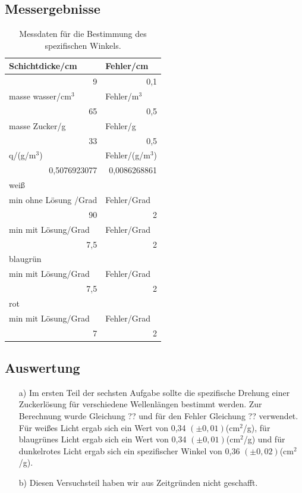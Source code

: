 \documentclass[12pt]{scrartcl}
\begin{document}
\subsection{Messergebnisse}
\begin{table}[htbp]
\caption{Messdaten für die Bestimmung des spezifischen Winkels.}
\begin{center}
\begin{tabular}{|l|l|}
\hline
Schichtdicke/cm & Fehler/cm \\ \hline
\multicolumn{1}{|r|}{9} & \multicolumn{1}{r|}{0,1} \\ \hline
masse wasser/cm$^3$ & Fehler/m$^3$ \\ \hline
\multicolumn{1}{|r|}{65} & \multicolumn{1}{r|}{0,5} \\ \hline
masse Zucker/g & Fehler/g \\ \hline
\multicolumn{1}{|r|}{33} & \multicolumn{1}{r|}{0,5} \\ \hline
q/(g/m$^3$) & Fehler/(g/m$^3$) \\ \hline
\multicolumn{1}{|r|}{0,5076923077} & \multicolumn{1}{r|}{0,0086268861} \\ \hline
weiß &  \\ \hline
min ohne Lösung /Grad & Fehler/Grad \\ \hline
\multicolumn{1}{|r|}{90} & \multicolumn{1}{r|}{2} \\ \hline
min mit Lösung/Grad & Fehler/Grad \\ \hline
\multicolumn{1}{|r|}{7,5} & \multicolumn{1}{r|}{2} \\ \hline
blaugrün &  \\ \hline
min mit Lösung/Grad & Fehler/Grad \\ \hline
\multicolumn{1}{|r|}{7,5} & \multicolumn{1}{r|}{2} \\ \hline
rot &  \\ \hline
min mit Lösung/Grad & Fehler/Grad \\ \hline
\multicolumn{1}{|r|}{7} & \multicolumn{1}{r|}{2} \\ \hline
\end{tabular}
\end{center}
\label{tab:a_6}
\end{table}
\subsection{Auswertung}
\begin{enumerate}
\item[a)]
Im ersten Teil der sechsten Aufgabe sollte die spezifische Drehung einer Zuckerlösung für verschiedene Wellenlängen bestimmt werden. Zur Berechnung wurde Gleichung ?? und für den Fehler Gleichung ?? verwendet. Für weißes Licht ergab sich ein Wert von 0,34 $(\pm 0,01)$(cm$^2$/g), für blaugrünes Licht ergab sich ein Wert von 0,34 $(\pm 0,01)$(cm$^2$/g) und für dunkelrotes Licht ergab sich ein spezifischer Winkel von 0,36 $(\pm 0,02)$(cm$^2$/g).

\item[b)]
Diesen Versuchsteil haben wir aus Zeitgründen nicht geschafft.
\end{enumerate}
\end{document}
